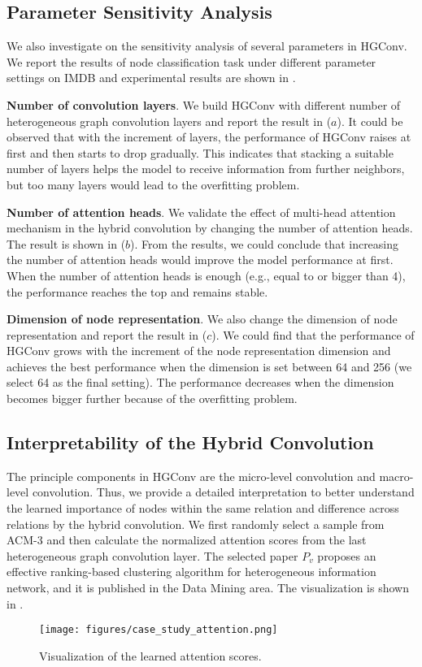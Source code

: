 \subsection{Parameter Sensitivity Analysis}
We also investigate on the sensitivity analysis of several parameters in HGConv. We report the results of node classification task under different parameter settings on IMDB and experimental results are shown in .

\textbf{Number of convolution layers}.
We build HGConv with different number of heterogeneous graph convolution layers and report the result in  ($a$). It could be observed that with the increment of layers, the performance of HGConv raises at first and then starts to drop gradually. This indicates that stacking a suitable number of layers helps the model to receive information from further neighbors, but too many layers would lead to the overfitting problem.

\textbf{Number of attention heads}.
We validate the effect of multi-head attention mechanism in the hybrid convolution by changing the number of attention heads. The result is shown in  ($b$). From the results, we could conclude that increasing the number of attention heads would improve the model performance at first. When the number of attention heads is enough (e.g., equal to or bigger than 4),  the performance reaches the top and remains stable.

\textbf{Dimension of node representation}.
We also change the dimension of node representation and report the result in  ($c$). We could find that the performance of HGConv grows with the increment of the node representation dimension and achieves the best performance when the dimension is set between 64 and 256 (we select 64 as the final setting). The performance decreases when the dimension becomes bigger further because of the overfitting problem.

\subsection{Interpretability of the Hybrid Convolution}
The principle components in HGConv are the micro-level convolution and macro-level convolution. Thus, we provide a detailed interpretation to better understand the learned importance of nodes within the same relation and difference across relations by the hybrid convolution. We first randomly select a sample from ACM-3 and then calculate the normalized attention scores from the last heterogeneous graph convolution layer. The selected paper $P_v$ proposes an effective ranking-based clustering algorithm for heterogeneous information network, and it is published in the Data Mining area. The visualization is shown in .
\begin{figure}[!htbp]
    \centering
    \texttt{[image: figures/case\_study\_attention.png]}    
    \caption{Visualization of the learned attention scores.}
    \label{fig:attention_case_study}
\end{figure}

